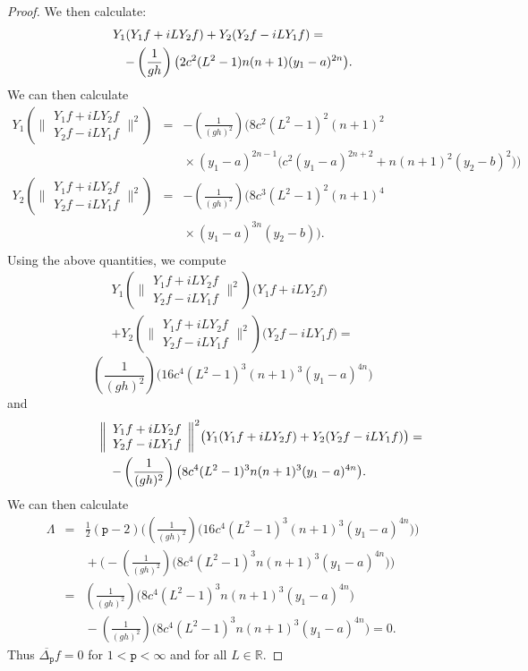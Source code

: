 \documentclass[12pt]{amsart}
\theoremstyle{plain}
\theoremstyle{definition}
\numberwithin{equation}{section}
\begin{document}
\begin{proof}
We then calculate:
\begin{eqnarray*}
\lefteqn{Y_1(Y_1f+iLY_2f)+Y_2(Y_2f-iLY_1f) =} & & \\
& & -\left(\frac{1}{gh}\right)\big(2c^2(L^2-1)n(n+1)(y_1-a)^{2n} \big).
\end{eqnarray*}
We can then calculate
\begin{eqnarray*}
Y_1\left( \bigg\| \begin{array}{c}
 Y_1f+iLY_2f\\
 Y_2f-iLY_1f
\end{array} \bigg\|^{2}\right)
& = & -\left(\frac{1}{(gh)^2}\right)\bigg(8c^2(L^2-1)^2(n+1)^2\\
& & \mbox{}\times (y_1-a)^{2n-1}\big(c^2(y_1-a)^{2n+2}+n(n+1)^2(y_2-b)^2\big) \bigg)\\
Y_2\left( \bigg\| \begin{array}{c}
 Y_1f+iLY_2f\\
 Y_2f-iLY_1f
\end{array} \bigg\|^{2}\right)
& = & -\left(\frac{1}{(gh)^2}\right)\big(8c^3(L^2-1)^2(n+1)^4\\
& & \mbox{}\times(y_1-a)^{3n}(y_2-b) \big).\\
\end{eqnarray*}
Using the above quantities, we compute
\begin{eqnarray*}
Y_1\left( \bigg\| \begin{array}{c}
 Y_1f+iLY_2f\\
 Y_2f-iLY_1f
\end{array} \bigg\|^{2}\right)\big(Y_1f+iLY_2f\big)\\
+Y_2\left( \bigg\| \begin{array}{c}
 Y_1f+iLY_2f\\
 Y_2f-iLY_1f
\end{array} \bigg\|^{2}\right)\big(Y_2f-iLY_1f\big)=
\end{eqnarray*}
$$\left(\frac{1}{(gh)^2}\right)\big(16c^4(L^2-1)^3(n+1)^3(y_1-a)^{4n} \big)$$
and
\begin{eqnarray*}
\lefteqn{\bigg\| \begin{array}{c}
 Y_1f+iLY_2f\\
 Y_2f-iLY_1f
\end{array} \bigg\|^{2}\big(Y_1(Y_1f+iLY_2f)+Y_2(Y_2f-iLY_1f)\big)=} && \\
& &-\left(\frac{1}{(gh)^2}\right)\big(8c^4(L^2-1)^3n(n+1)^3(y_1-a)^{4n} \big).\\
\end{eqnarray*}
We can then calculate 
\begin{eqnarray*}
\Lambda &= & \frac{1}{2}({\texttt{p}}-2)\bigg(\left(\frac{1}{(gh)^2}\right)\big(16c^4(L^2-1)^3(n+1)^3(y_1-a)^{4n} \big)\bigg)\\
& & \mbox{}+\bigg(-\left(\frac{1}{(gh)^2}\right)\big(8c^4(L^2-1)^3n(n+1)^3(y_1-a)^{4n} \big)\bigg)\\
& = & \left(\frac{1}{(gh)^2}\right)\big(8c^4(L^2-1)^3n(n+1)^3(y_1-a)^{4n} \big)\\
& & \mbox{}-\left(\frac{1}{(gh)^2}\right)\big(8c^4(L^2-1)^3n(n+1)^3(y_1-a)^{4n} \big)=0.
\end{eqnarray*}
Thus $\overline{\Delta_{\texttt{p}}}f=0 $ for $1<{\texttt{p}}<\infty$ and for all $L \in \mathbb{R}$.
\end{proof}
\end{document}

